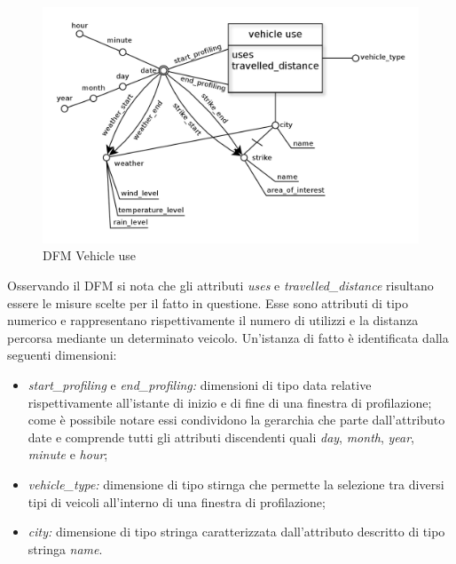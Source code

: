 \begin{figure}[H]                                                                                                                                                            
\centering                                                                                                                                                                   
\includegraphics[width=\textwidth]{diagrams/dfm}                                                                                                                                   
\caption{DFM Vehicle use}                                                                                                                                            
\label{fig:dfm}                                                                                                                                                           
\end{figure}

Osservando il DFM si nota che gli attributi \textit{uses} e \textit{travelled\_distance} risultano
essere le misure scelte per il fatto in questione. Esse sono attributi di tipo numerico e
rappresentano rispettivamente il numero di utilizzi e la distanza percorsa mediante un determinato
veicolo.
Un'istanza di fatto è identificata dalla seguenti dimensioni:
\begin{itemize}
\item \textit{start\_profiling} e \textit{end\_profiling:} dimensioni di tipo data relative
rispettivamente all'istante di inizio e di fine di una finestra di profilazione; come è possibile
notare essi condividono la gerarchia che parte dall'attributo date e comprende tutti gli 
attributi discendenti quali \textit{day}, \textit{month}, \textit{year}, \textit{minute} e
\textit{hour};
\item \textit{vehicle\_type:} dimensione di tipo stirnga che permette la selezione tra diversi
tipi di veicoli all'interno di una finestra di profilazione;
\item \textit{city:} dimensione di tipo stringa caratterizzata dall'attributo descritto di tipo
stringa \textit{name}.
\end{itemize}

